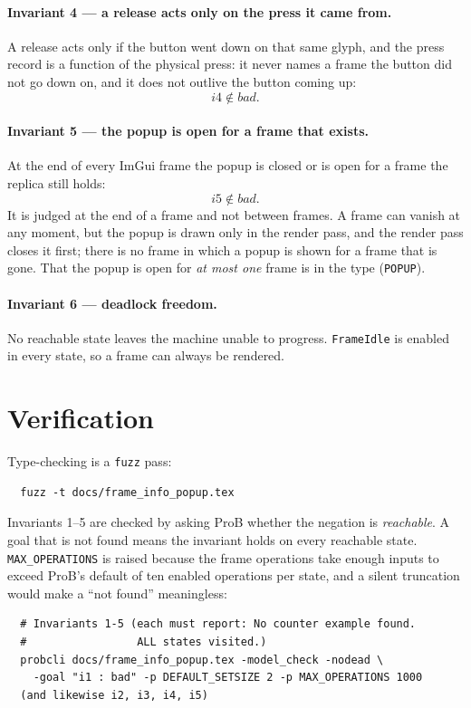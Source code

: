 \documentclass[a4paper,10pt,fleqn]{article}
\begin{document}
\paragraph{Invariant 4 --- a release acts only on the press it came from.}
A release acts only if the button went down on that same glyph, and the press
record is a function of the physical press: it never names a frame the button
did not go down on, and it does not outlive the button coming up:
\[
  i4 \notin bad.
\]

\paragraph{Invariant 5 --- the popup is open for a frame that exists.}
At the end of every ImGui frame the popup is closed or is open for a frame the
replica still holds:
\[
  i5 \notin bad.
\]
It is judged at the end of a frame and not between frames.  A frame can vanish
at any moment, but the popup is drawn only in the render pass, and the render
pass closes it first; there is no frame in which a popup is shown for a frame
that is gone.  That the popup is open for \emph{at most one} frame is in the
type (\texttt{POPUP}).

\paragraph{Invariant 6 --- deadlock freedom.}
No reachable state leaves the machine unable to progress.  \texttt{FrameIdle}
is enabled in every state, so a frame can always be rendered.

\section{Verification}
\label{sec:verify}

Type-checking is a \texttt{fuzz} pass:
\begin{verbatim}
  fuzz -t docs/frame_info_popup.tex
\end{verbatim}

Invariants 1--5 are checked by asking ProB whether the negation is
\emph{reachable}.  A goal that is not found means the invariant holds on every
reachable state.  \texttt{MAX\_OPERATIONS} is raised because the frame
operations take enough inputs to exceed ProB's default of ten enabled
operations per state, and a silent truncation would make a ``not found''
meaningless:
\begin{verbatim}
  # Invariants 1-5 (each must report: No counter example found.
  #                 ALL states visited.)
  probcli docs/frame_info_popup.tex -model_check -nodead \
    -goal "i1 : bad" -p DEFAULT_SETSIZE 2 -p MAX_OPERATIONS 1000
  (and likewise i2, i3, i4, i5)
\end{verbatim}
\end{document}
